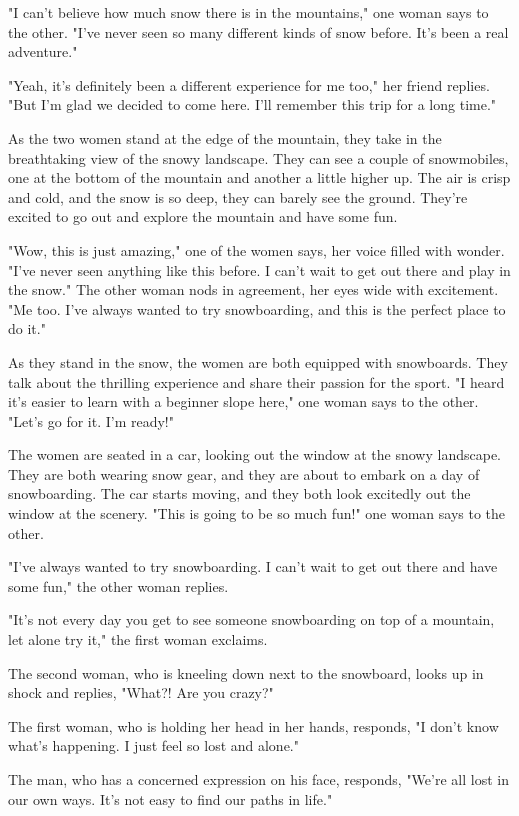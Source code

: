 \documentclass[smalldemyvopaper,11pt,twoside,onecolumn,openright,extrafontsizes]{memoir}
\begin{document}
"I can't believe how much snow there is in the mountains," one woman says to the other. "I've never seen so many different kinds of snow before. It's been a real adventure."\par
"Yeah, it's definitely been a different experience for me too," her friend replies. "But I'm glad we decided to come here. I'll remember this trip for a long time."\par
As the two women stand at the edge of the mountain, they take in the breathtaking view of the snowy landscape. They can see a couple of snowmobiles, one at the bottom of the mountain and another a little higher up. The air is crisp and cold, and the snow is so deep, they can barely see the ground. They're excited to go out and explore the mountain and have some fun.\par
"Wow, this is just amazing," one of the women says, her voice filled with wonder. "I've never seen anything like this before. I can't wait to get out there and play in the snow." The other woman nods in agreement, her eyes wide with excitement. "Me too. I've always wanted to try snowboarding, and this is the perfect place to do it."\par
As they stand in the snow, the women are both equipped with snowboards. They talk about the thrilling experience and share their passion for the sport. "I heard it's easier to learn with a beginner slope here," one woman says to the other. "Let's go for it. I'm ready!"\par
The women are seated in a car, looking out the window at the snowy landscape. They are both wearing snow gear, and they are about to embark on a day of snowboarding. The car starts moving, and they both look excitedly out the window at the scenery. "This is going to be so much fun!" one woman says to the other.\par
"I've always wanted to try snowboarding. I can't wait to get out there and have some fun," the other woman replies.\par
"It's not every day you get to see someone snowboarding on top of a mountain, let alone try it," the first woman exclaims.\par
The second woman, who is kneeling down next to the snowboard, looks up in shock and replies, "What?! Are you crazy?"\par
The first woman, who is holding her head in her hands, responds, "I don't know what's happening. I just feel so lost and alone."\par
The man, who has a concerned expression on his face, responds, "We're all lost in our own ways. It's not easy to find our paths in life."\par
\end{document}

